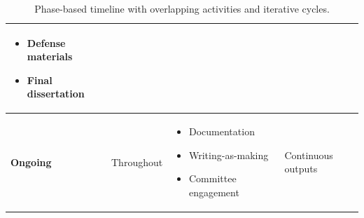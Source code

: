 \begin{table}[H]
\begin{tabular}{|l|p{3cm}|p{4cm}|p{5cm}|}
\begin{itemize}[nosep,leftmargin=*]
			\item Defense materials
			\item Final dissertation
		\end{itemize} \\
		\hline
		\rowcolor{gray!10}
		\textbf{Ongoing} & Throughout & 
		\begin{itemize}[nosep,leftmargin=*]
			\item Documentation
			\item Writing-as-making
			\item Committee engagement
		\end{itemize} & 
		Continuous outputs \\
		\hline
	\end{tabular}
	\caption{Phase-based timeline with overlapping activities and iterative cycles.}
	\label{tab:timeline}
\end{table}
